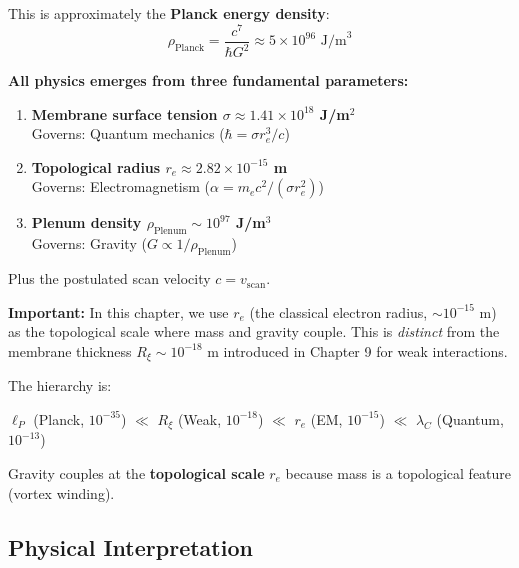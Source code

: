 This is approximately the \textbf{Planck energy density}:
\begin{equation}
\rho_{\text{Planck}} = \frac{c^7}{\hbar G^2} \approx 5 \times 10^{96} \text{ J/m}^3
\end{equation}

\begin{tcolorbox}[colback=blue!5,colframe=blue!50!black,title=The Three Pillars of EDC]
\textbf{All physics emerges from three fundamental parameters:}
\begin{enumerate}
    \item \textbf{Membrane surface tension $\sigma \approx 1.41 \times 10^{18}$ J/m$^2$}\\
    Governs: Quantum mechanics ($\hbar = \sigma r_e^3/c$)
    
    \item \textbf{Topological radius $r_e \approx 2.82 \times 10^{-15}$ m}\\
    Governs: Electromagnetism ($\alpha = m_e c^2/(\sigma r_e^2)$)
    
    \item \textbf{Plenum density $\rho_{\text{Plenum}} \sim 10^{97}$ J/m$^3$}\\
    Governs: Gravity ($G \propto 1/\rho_{\text{Plenum}}$)
\end{enumerate}

Plus the postulated scan velocity $c = v_{\text{scan}}$.
\end{tcolorbox}

\begin{tcolorbox}[colback=yellow!5,colframe=yellow!60!black,title=\textbf{Clarification: Scale Terminology}]
\textbf{Important:} In this chapter, we use $r_e$ (the classical electron radius, $\sim 10^{-15}$ m) as the topological scale where mass and gravity couple. This is \textit{distinct} from the membrane thickness $R_\xi \sim 10^{-18}$ m introduced in Chapter 9 for weak interactions.

The hierarchy is:
\begin{center}
$\ell_P$ (Planck, $10^{-35}$) $\ll$ $R_\xi$ (Weak, $10^{-18}$) $\ll$ $r_e$ (EM, $10^{-15}$) $\ll$ $\lambda_C$ (Quantum, $10^{-13}$)
\end{center}

Gravity couples at the \textbf{topological scale} $r_e$ because mass is a topological feature (vortex winding).
\end{tcolorbox}

\subsection{Physical Interpretation}

